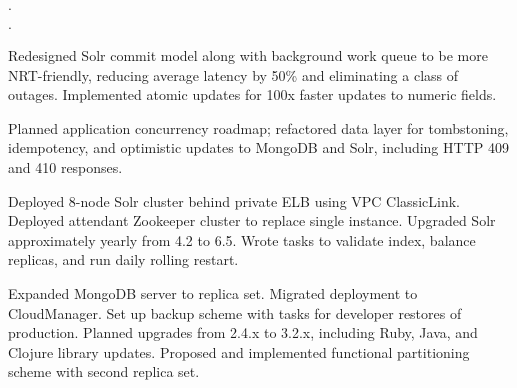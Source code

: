 \documentclass[11pt]{article}
\newenvironment{achievements}{\begin{list}{\bf \Large $\cdot$}{\topsep 2pt \itemsep 0pt}}{\vspace*{3pt}\end{list}}
\newenvironment{achievements2}{\begin{list}{\bf \Large $\cdot$}{\topsep 2pt \itemsep 0pt \leftmargin 12pt }}{\vspace*{3pt}\end{list}}
\DeclareRobustCommand{\csharplogo}{\hbox{C\hspace{-0.5ex}
    \protect\raisebox{0.5ex}
    {\protect\scalebox{0.67}{\#}}}}
\begin{document}
\begin{achievements}
\begin{achievements2}
    \item Redesigned Solr commit model along with background work queue to be
      more NRT-friendly, reducing average latency by 50\% and eliminating a
      class of outages.  Implemented atomic updates for 100x faster updates to
      numeric fields.

    \item Planned application concurrency roadmap; refactored data layer for
      tombstoning, idempotency, and optimistic updates to MongoDB and Solr,
      including HTTP 409 and 410 responses.

    \item Deployed 8-node Solr cluster behind private ELB using VPC
      ClassicLink.  Deployed attendant Zookeeper cluster to replace single
      instance.  Upgraded Solr approximately yearly from 4.2 to 6.5.  Wrote
      tasks to validate index, balance replicas, and run daily rolling restart.

    \item Expanded MongoDB server to replica set.  Migrated deployment to
      CloudManager.  Set up backup scheme with tasks for developer restores of
      production.  Planned upgrades from 2.4.x to 3.2.x, including Ruby, Java,
      and Clojure library updates.  Proposed and implemented functional
      partitioning scheme with second replica set.



    \end{achievements2}

  \end{achievements}

 
\end{document}
